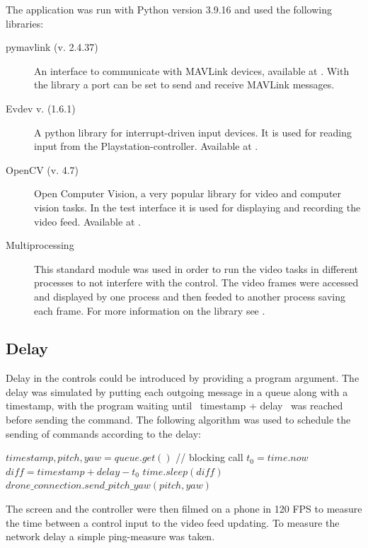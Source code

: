 \documentclass[nofilelist]{cslthse-msc}
\begin{document}
The application was run with Python version 3.9.16 and used the following libraries:
\begin{description} 
   \item [pymavlink (v. 2.4.37)]
   An interface to communicate with MAVLink devices, available at \cite{pymavlink}. With the library a port can be set to send and receive MAVLink messages.
 
   \item [Evdev v. (1.6.1)]
   A python library for interrupt-driven input devices. It is used for reading input from the Playstation-controller. Available at \cite{evdev}.

   \item [OpenCV (v. 4.7)] 
   Open Computer Vision, a very popular library for video and computer vision tasks. In the test interface it is used for displaying and recording the video feed. Available at \cite{opencv}.

   \item[Multiprocessing]
   This standard module was used in order to run the video tasks in different processes to not interfere with the control. The video frames were accessed and displayed by one process and then feeded to another process saving each frame. For more information on the library see \cite{multiprocessing}.  
\end{description}

\subsection{Delay}

Delay in the controls could be introduced by providing a program argument. The delay was simulated by putting each outgoing message in a queue along with a timestamp, with the program waiting until \ timestamp + delay \ was reached before sending the command. The following algorithm was used to schedule the sending of commands according to the delay:
\begin{algorithmic}
   \State $timestamp, pitch, yaw = queue.get()$ // blocking call
   \State $t_{0} = time.now$
   \State $diff = timestamp + delay - t_{0}$
      \State $time.sleep(diff)$
   \EndIf
   \State $drone\_connection.send\_pitch\_yaw(pitch, yaw)$
   \EndWhile
\end{algorithmic}

The screen and the controller were then filmed on a phone in 120 FPS to measure the time between a control input to the video feed updating. To measure the network delay a simple ping-measure was taken.
\end{document}
